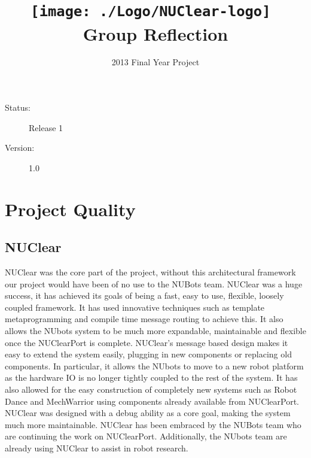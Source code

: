 \documentclass[english,12pt]{scrartcl}
\title{\texttt{[image: ./Logo/NUClear-logo]}~\\[1cm] Group Reflection}
\author{2013 Final Year Project}
\begin{document}
	\maketitle
	\vfill
	{\large
		\begin{description}
			\item [Status:] Release 1
			\item [Version:] 1.0
		\end{description}}

	\clearpage
	\tableofcontents

	\clearpage

\section{Project Quality}
	\subsection{NUClear}
		NUClear was the core part of the project, without this architectural framework our project would have been of no use to the NUBots team.
		NUClear was a huge success, it has achieved its goals of being a fast, easy to use, flexible, loosely coupled framework.
		It has used innovative techniques such as template metaprogramming and compile time message routing to achieve this.
		It also allows the NUbots system to be much more expandable, maintainable and flexible once the NUClearPort is complete.
		NUClear’s message based design makes it easy to extend the system easily, plugging in new components or replacing old components.
		In particular, it allows the NUbots to move to a new robot platform as the hardware IO is no longer tightly coupled to the rest of the system.
		It has also allowed for the easy construction of completely new systems such as Robot Dance and MechWarrior using components already available from NUClearPort.
		NUClear was designed with a debug ability as a core goal, making the system much more maintainable. NUClear has been embraced by the NUBots team who are continuing the work on NUClearPort.
		Additionally, the NUbots team are already using NUClear to assist in robot research.
\end{document}
